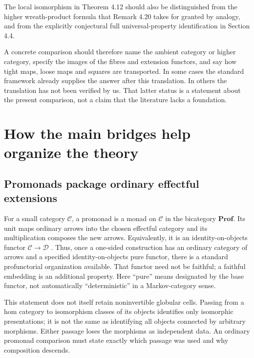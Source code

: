 \documentclass[11pt,letterpaper]{article}
\newcommand{\Prof}{\mathbf{Prof}}
\begin{document}
The local isomorphism in Theorem 4.12 should also be distinguished from the higher wreath-product formula that Remark 4.20 takes for granted by analogy, and from the explicitly conjectural full universal-property identification in Section 4.4.

A concrete comparison should therefore name the ambient category or higher category, specify the images of the fibres and extension functors, and say how tight maps, loose maps and squares are transported. In some cases the standard framework already supplies the answer after this translation. In others the translation has not been verified by us. That latter status is a statement about the present comparison, not a claim that the literature lacks a foundation.

\section{How the main bridges help organize the theory}
\label{sec:bridges}
\subsection{Promonads package ordinary effectful extensions}
For a small category $\mathcal C$, a promonad is a monad on $\mathcal C$ in the bicategory $\Prof$. Its unit maps ordinary arrows into the chosen effectful category and its multiplication composes the new arrows. Equivalently, it is an identity-on-objects functor $\mathcal C\to\mathcal D$ \cite[Theorem 3.9 and Appendix B.2]{Roman}. Thus, once a one-sided construction has an ordinary category of arrows and a specified identity-on-objects pure functor, there is a standard profunctorial organization available. That functor need not be faithful; a faithful embedding is an additional property. Here ``pure'' means designated by the base functor, not automatically ``deterministic'' in a Markov-category sense.

This statement does not itself retain noninvertible globular cells. Passing from a hom category to isomorphism classes of its objects identifies only isomorphic presentations; it is not the same as identifying all objects connected by arbitrary morphisms. Either passage loses the morphisms as independent data. An ordinary promonad comparison must state exactly which passage was used and why composition descends.
\end{document}
